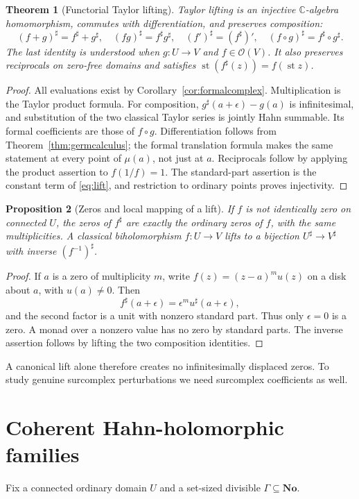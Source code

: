 \documentclass[11pt,a4paper]{article}
\newtheorem{theorem}{Theorem}[section]
\newtheorem{proposition}[theorem]{Proposition}
\theoremstyle{definition}
\theoremstyle{remark}
\newcommand{\No}{\mathbf{No}}
\newcommand{\C}{\mathbb C}
\newcommand{\OO}{\mathcal O}
\newcommand{\st}{\operatorname{st}}
\begin{document}
\begin{theorem}[Functorial Taylor lifting]\label{thm:lift}
Taylor lifting is an injective $\C$-algebra homomorphism, commutes
with differentiation, and preserves composition:
\[
 (f+g)^\sharp=f^\sharp+g^\sharp,\quad
 (fg)^\sharp=f^\sharp g^\sharp,\quad
 (f')^\sharp=(f^\sharp)',\quad
 (f\circ g)^\sharp=f^\sharp\circ g^\sharp.
\]
The last identity is understood when $g:U\to V$ and $f\in\OO(V)$.
It also preserves reciprocals on zero-free domains and satisfies
$\st(f^\sharp(z))=f(\st z)$.
\end{theorem}
\begin{proof}
All evaluations exist by Corollary~\ref{cor:formalcomplex}.
Multiplication is the Taylor product formula. For composition,
$g^\sharp(a+\epsilon)-g(a)$ is infinitesimal, and substitution of
the two classical Taylor series is jointly Hahn summable. Its formal
coefficients are those of $f\circ g$. Differentiation follows from
Theorem~\ref{thm:germcalculus}; the formal translation formula makes
the same statement at every point of $\mu(a)$, not just at $a$.
Reciprocals follow by applying the product assertion to $f(1/f)=1$.
The standard-part assertion is the constant term of \eqref{eq:lift},
and restriction to ordinary points proves injectivity.
\end{proof}

\begin{proposition}[Zeros and local mapping of a lift]\label{prop:liftzeros}
If $f$ is not identically zero on connected $U$, the zeros of
$f^\sharp$ are exactly the ordinary zeros of $f$, with the same
multiplicities. A classical biholomorphism $f:U\to V$ lifts to a
bijection $U^\sharp\to V^\sharp$ with inverse $(f^{-1})^\sharp$.
\end{proposition}
\begin{proof}
If $a$ is a zero of multiplicity $m$, write
$f(z)=(z-a)^m u(z)$ on a disk about $a$, with $u(a)\ne0$. Then
\[
 f^\sharp(a+\epsilon)=\epsilon^m u^\sharp(a+\epsilon),
\]
and the second factor is a unit with nonzero standard part. Thus only
$\epsilon=0$ is a zero. A monad over a nonzero value has no zero by
standard parts. The inverse assertion follows by lifting the two
composition identities.
\end{proof}
A canonical lift alone therefore creates no infinitesimally displaced
zeros. To study genuine surcomplex perturbations we need surcomplex
coefficients as well.

\section{Coherent Hahn-holomorphic families}\label{sec:H}
Fix a connected ordinary domain $U$ and a set-sized divisible
$\Gamma\subseteq\No$.
\end{document}
